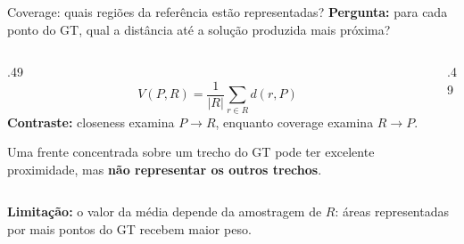 \begin{frame}{Coverage: quais regiões da referência estão representadas?}
\textbf{Pergunta:} para cada ponto do GT, qual a distância até a solução produzida mais próxima?
\begin{columns}[T,onlytextwidth]
\begin{column}{.49\textwidth}
\[
\boxed{\displaystyle V(P,R)=\frac1{|R|}\sum_{r\in R}d(r,P)}
\]
\textbf{Contraste:} closeness examina $P\to R$, enquanto coverage examina $R\to P$.
\par\smallskip
Uma frente concentrada sobre um trecho do GT pode ter excelente proximidade, mas \textbf{não representar os outros trechos}.
\end{column}
\begin{column}{.49\textwidth}\centering
{}
\FairLegend
\end{column}
\end{columns}
\vspace{.13cm}
\textbf{Limitação:} o valor da média depende da amostragem de $R$: áreas representadas por mais pontos do GT recebem maior peso.
\end{frame}

